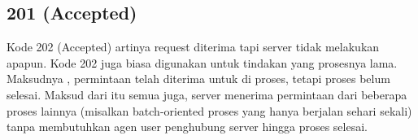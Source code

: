 \documentclass[12pt,a4paper]{article}
\begin{document}
\subsection{201 (Accepted)}
Kode 202 (Accepted) artinya request diterima tapi server tidak melakukan apapun. Kode 202 juga biasa digunakan untuk tindakan yang prosesnya lama. Maksudnya , permintaan telah diterima untuk di proses, tetapi proses belum selesai. 
Maksud dari itu semua juga, server menerima permintaan dari beberapa proses lainnya (misalkan batch-oriented proses yang hanya berjalan sehari sekali) tanpa membutuhkan agen user penghubung server hingga proses selesai.
\end{document}
